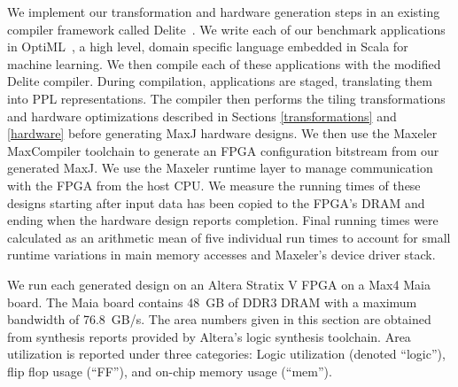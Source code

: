 We implement our transformation and hardware generation steps in an existing compiler framework called Delite~\cite{delite-tecs14}.
We write each of our benchmark applications in OptiML~\cite{optiml}, a high level, domain specific language embedded in Scala for machine learning.
We then compile each of these applications with the modified Delite compiler.
During compilation, applications are staged, translating them into PPL representations.
The compiler then performs the tiling transformations and hardware optimizations described in Sections \ref{transformations} and \ref{hardware} before generating MaxJ hardware designs.
We then use the Maxeler MaxCompiler toolchain to generate an FPGA configuration bitstream from our generated MaxJ. We use the Maxeler runtime layer to manage communication with the FPGA from the host CPU.
We measure the running times of these designs starting after input data has been copied to the FPGA's DRAM and ending when the hardware design reports completion.
Final running times were calculated as an arithmetic mean of five individual run times to account for small runtime variations in main memory accesses and Maxeler's device driver stack.

We run each generated design on an Altera Stratix V FPGA on a Max4 Maia board.
The Maia board contains 48~GB of DDR3 DRAM with a maximum bandwidth of 76.8~GB/s.
The area numbers given in this section are obtained from synthesis reports provided by Altera's logic synthesis toolchain.
Area utilization is reported under three categories: Logic utilization (denoted ``logic''), flip flop usage (``FF''), and on-chip memory usage (``mem'').




